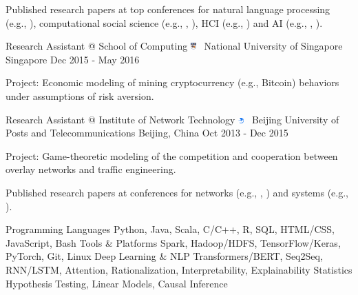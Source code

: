 \documentclass[letterpaper]{awesome-cv}
\begin{document}
\begin{cventries}
{\begin{cvitems}
        \item {Published  research papers at top conferences for natural language processing (e.g., ), computational social science (e.g., , ), HCI (e.g., ) and AI (e.g., , ).}
      \end{cvitems}
    }
  \cventry
    {Research Assistant @ School of Computing}
    {\includegraphics[width=0.016\textwidth]{../images/logos/nus.png}~ National University of Singapore}
    {Singapore}
    {Dec 2015 - May 2016}
    {
      \begin{cvitems}
        \item {Project: Economic modeling of mining cryptocurrency (e.g., Bitcoin) behaviors under assumptions of risk aversion.}
      \end{cvitems}
    }
  \cventry
    {Research Assistant @ Institute of Network Technology}
    {\includegraphics[width=0.016\textwidth]{../images/logos/bupt.png}~ Beijing University of Posts and Telecommunications}
    {Beijing, China}
    {Oct 2013 - Dec 2015}
    {
      \begin{cvitems}
        \item {Project: Game-theoretic modeling of the competition and cooperation between overlay networks and traffic engineering.}
        \item {Published research papers at conferences for networks (e.g., , ) and systems (e.g., ).}
      \end{cvitems}
    }
\end{cventries}

\addvspace{0.2ex}
\begin{cventries}
 \cvskillnew
    {Programming Languages}
    {Python, Java, Scala, C/C++, R, SQL, HTML/CSS, JavaScript, Bash}
  \cvskillnew
    {Tools \& Platforms}
    {Spark, Hadoop/HDFS, TensorFlow/Keras, PyTorch, Git, Linux}
  \cvskillnew
    {Deep Learning \& NLP}
    {Transformers/BERT, Seq2Seq, RNN/LSTM, Attention, Rationalization, Interpretability, Explainability}
  \cvskillnew
    {Statistics}
    {Hypothesis Testing, Linear Models, Causal Inference}
\end{cventries}
\end{document}
